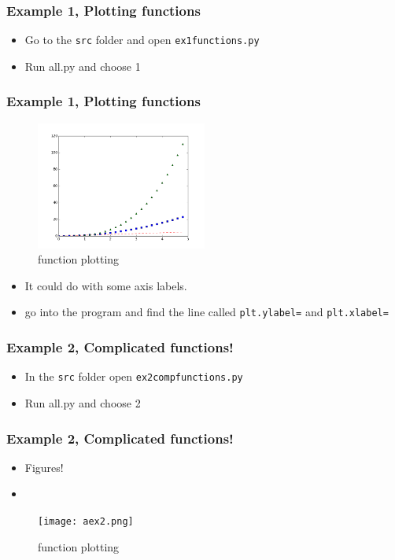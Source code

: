 \documentclass{beamer}
\begin{document}
\begin{frame}
\frametitle{Example 1, Plotting functions}
\begin{itemize}
	\item Go to the \texttt{src} folder and open \texttt{ex1functions.py} 
	\item Run all.py and choose 1 
\end{itemize}
\end{frame}

\begin{frame}
\frametitle{Example 1, Plotting functions}
\begin{figure}
	\centering
	\includegraphics[width=0.5\textwidth]{ex1.png}
	\caption{function plotting}
	\label{fig:function}
\end{figure}
\begin{itemize}
	\item It could do with some axis labels. 
	\item go into the program and find the line called \texttt{plt.ylabel=} and \texttt{plt.xlabel=}  
\end{itemize}
\end{frame}

\begin{frame}
\frametitle{Example 2, Complicated functions!}
\begin{itemize}
\item In the \texttt{src} folder open \texttt{ex2compfunctions.py} 
\item Run all.py and choose 2 
\end{itemize}
\end{frame}

\begin{frame}
\frametitle{Example 2, Complicated functions!}
\begin{itemize}
\item Figures!
\item
\end{itemize}
\begin{figure}
	\centering
	\texttt{[image: aex2.png]}
	\caption{function plotting}
	\label{fig:function}
\end{figure}
\end{frame}
\end{document}
